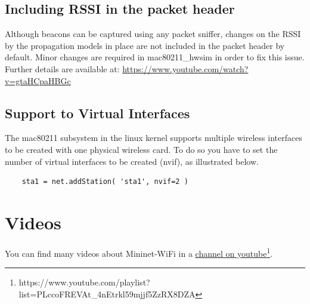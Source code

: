 \subsection{Including RSSI in the packet header}
Although beacons can be captured using any packet sniffer, changes on the RSSI by the propagation models in place are
not included in the packet header by default. Minor changes are required in mac80211\_hwsim in order to fix this issue. Further details are available at: \url{https://www.youtube.com/watch?v=gtaHCpaHBGc}

\subsection{Support to Virtual Interfaces}

The mac80211 subsystem in the linux kernel supports multiple wireless interfaces to be created with one physical wireless card. To do so you have to set the number of virtual interfaces to be created (nvif), as illustrated below.

\begin{verbatim}
    sta1 = net.addStation( 'sta1', nvif=2 )
\end{verbatim}







\section{Videos}
You can find many videos about Mininet-WiFi in a \underline{\href{https://www.youtube.com/playlist?list=PLccoFREVAt\_4nEtrkl59mjjf5ZzRX8DZA}{channel on youtube}}\footnote{https://www.youtube.com/playlist?list=PLccoFREVAt\_4nEtrkl59mjjf5ZzRX8DZA}.

